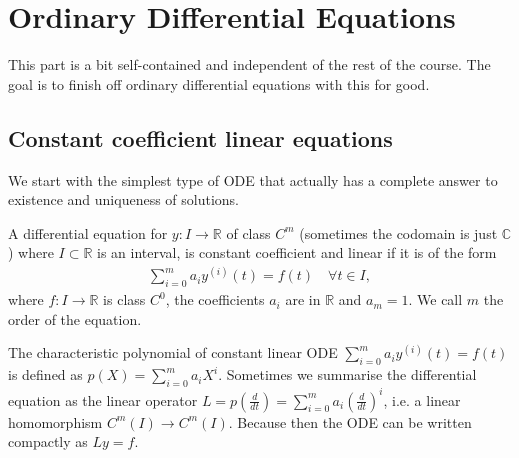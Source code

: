 
\chapter{Ordinary Differential Equations}

This part is a bit self-contained and independent of the rest of the course. The goal is to finish off ordinary differential equations with this for good.

\section{Constant coefficient linear equations}

We start with the simplest type of ODE that actually has a complete answer to existence and uniqueness of solutions.

\begin{definition}\label{def:const-lin-ode}
   A differential equation for $y: I \to \mathbb{R}$ of class $C^{m}$ (sometimes the codomain is just $\mathbb{C}$) where $I \subset \mathbb{R}$ is an interval, is constant coefficient and linear if it is of the form
    \begin{align*}
        \sum_{i=0}^{m} a_{i}y^{(i)}(t) = f(t) \quad \forall t \in I,
    \end{align*}
    where $f: I \to \mathbb{R}$ is class $C^{0}$, the coefficients $a_{i}$ are in $\mathbb{R}$ and $a_{m} = 1$. We call $m$ the order of the equation.
\end{definition}

\begin{definition}\label{def:char-poly}
    The characteristic polynomial of constant linear ODE $\sum_{i=0}^{m} a_{i}y^{(i)}(t) = f(t)$ is defined as $p(X) = \sum_{i=0}^{m} a_{i}X^{i}$. Sometimes we summarise the differential equation as the linear operator $L = p\left( \frac{d}{dt} \right) = \sum_{i=0}^{m} a_{i}\left( \frac{d}{dt} \right)^{i}$, i.e. a linear homomorphism $C^{m}(I) \to C^{m}(I)$. Because then the ODE can be written compactly as $Ly = f$.
\end{definition}

